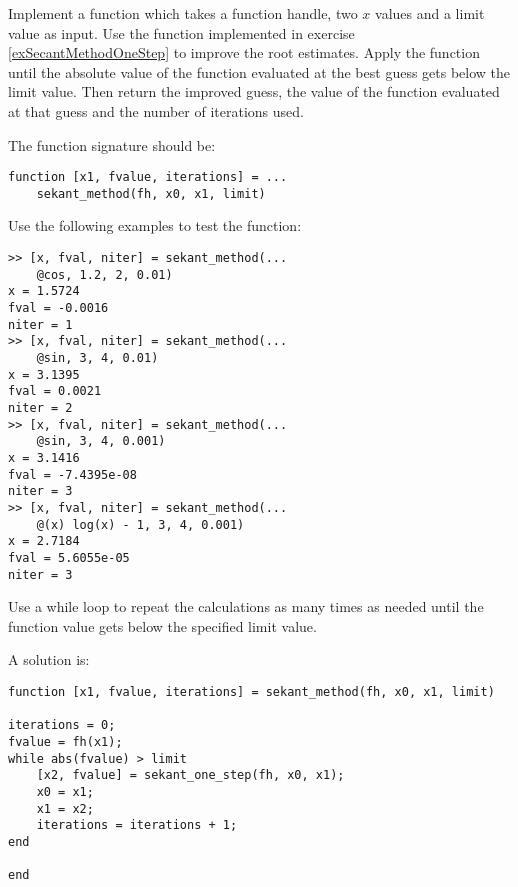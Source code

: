 \begin{ex}
Implement a function which takes a function handle, two $x$ 
values and a limit value as input.
Use the function implemented in exercise
\ref{exSecantMethodOneStep} to improve the root estimates.
Apply the function until the absolute value of the function 
evaluated at the best guess gets below the limit value.
Then return the improved guess, the value of the function 
evaluated at that guess and the number of
iterations used.

The function signature should be:
\begin{lstlisting}
function [x1, fvalue, iterations] = ...
    sekant_method(fh, x0, x1, limit)
\end{lstlisting}
Use the following examples to test the function:
\begin{lstlisting}
>> [x, fval, niter] = sekant_method(...
    @cos, 1.2, 2, 0.01)
x = 1.5724
fval = -0.0016
niter = 1
>> [x, fval, niter] = sekant_method(...
    @sin, 3, 4, 0.01)
x = 3.1395
fval = 0.0021
niter = 2
>> [x, fval, niter] = sekant_method(...
    @sin, 3, 4, 0.001)
x = 3.1416
fval = -7.4395e-08
niter = 3
>> [x, fval, niter] = sekant_method(...
    @(x) log(x) - 1, 3, 4, 0.001)
x = 2.7184
fval = 5.6055e-05
niter = 3
\end{lstlisting}
\begin{hint}
Use a while loop to repeat the calculations as many times 
as needed until the function value gets below the 
specified limit value.
\end{hint}
\begin{sol}
A solution is:
\begin{lstlisting}
function [x1, fvalue, iterations] = sekant_method(fh, x0, x1, limit)

iterations = 0;
fvalue = fh(x1);
while abs(fvalue) > limit
    [x2, fvalue] = sekant_one_step(fh, x0, x1);
    x0 = x1;
    x1 = x2;
    iterations = iterations + 1;
end

end
\end{lstlisting}
\end{sol}
\end{ex}


